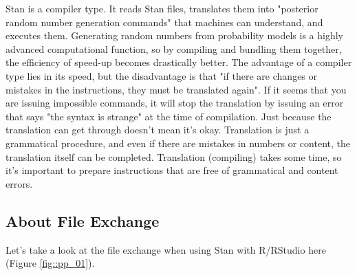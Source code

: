 \documentclass{ltjsbook}
\begin{document}
Stan is a compiler type. It reads Stan files, translates them into "posterior random number generation commands" that machines can understand, and executes them. Generating random numbers from probability models is a highly advanced computational function, so by compiling and bundling them together, the efficiency of speed-up becomes drastically better. The advantage of a compiler type lies in its speed, but the disadvantage is that "if there are changes or mistakes in the instructions, they must be translated again". If it seems that you are issuing impossible commands, it will stop the translation by issuing an error that says "the syntax is strange" at the time of compilation. Just because the translation can get through doesn't mean it's okay. Translation is just a grammatical procedure, and even if there are mistakes in numbers or content, the translation itself can be completed. Translation (compiling) takes some time, so it's important to prepare instructions that are free of grammatical and content errors.
\subsection{About File Exchange}
Let's take a look at the file exchange when using Stan with R/RStudio here (Figure \ref{fig::pp_01}).
\end{document}
